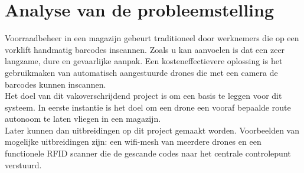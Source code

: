 \chapter{Analyse van de probleemstelling}
Voorraadbeheer in een magazijn gebeurt traditioneel door werknemers die op een vorklift handmatig barcodes inscannen. Zoals u kan aanvoelen is dat een zeer langzame, dure en gevaarlijke aanpak. Een kosteneffectievere oplossing is het gebruikmaken van automatisch aangestuurde drones die met een camera de barcodes kunnen inscannen.\\

Het doel van dit vakoverschrijdend project is om een basis te leggen voor dit systeem. In eerste instantie is het doel om een drone een vooraf bepaalde route autonoom te laten vliegen in een magazijn.\\
Later kunnen dan uitbreidingen op dit project gemaakt worden. Voorbeelden van mogelijke uitbreidingen zijn: een wifi-mesh van meerdere drones en een functionele RFID scanner die de gescande codes naar het centrale controlepunt verstuurd.